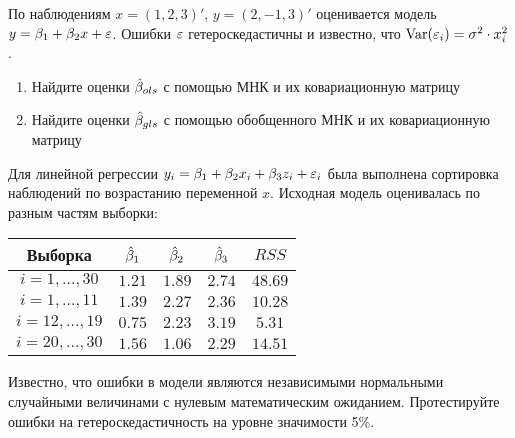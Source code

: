 \documentclass[pdftex,11pt,openany]{book}\usepackage[]{graphicx}\usepackage[]{color}
\begin{document}
\begin{problem}
По наблюдениям $x=(1,2,3)'$, $y=(2,-1,3)'$ оценивается модель $y=\beta_1+\beta_2 x+\varepsilon$. Ошибки $\varepsilon$ гетероскедастичны и известно, что $\operatorname{Var}(\varepsilon_i)=\sigma^2 \cdot x_i^2$. 
\begin{enumerate}
\item Найдите оценки $\hat{\beta}_{ols}$ с помощью МНК и их ковариационную матрицу
\item Найдите оценки $\hat{\beta}_{gls}$ с помощью обобщенного МНК и их ковариационную матрицу 
\end{enumerate}  
\end{problem}

\begin{solution}
\end{solution}




\begin{problem}
Для линейной регрессии $y_i = \beta_1 + \beta_2 x_i + \beta_3 z_i + \varepsilon_i$ была
выполнена сортировка наблюдений по возрастанию переменной $x$. Исходная модель оценивалась по разным частям выборки:

\begin{tabular}{c|cccc}
Выборка & $\hat{\beta}_1$ & $\hat{\beta}_2$ & $\hat{\beta}_3$ & $RSS$ \\
\hline 
$i=1,\ldots, 30$ & $1.21$ & $1.89$ & $2.74$ & $48.69$ \\ 
$i=1,\ldots, 11$ & $1.39$ & $2.27$ & $2.36$ & $10.28$ \\ 
$i=12,\ldots, 19$ & $0.75$ & $2.23$ & $3.19$ & $5.31$ \\ 
$i=20,\ldots, 30$ & $1.56$ & $1.06$ & $2.29$ & $14.51$ \\ 
\end{tabular} 

Известно, что ошибки в модели являются независимыми нормальными случайными величинами с нулевым математическим ожиданием. Протестируйте
ошибки на гетероскедастичность на уровне значимости 5\%.
\end{problem}
\end{document}
